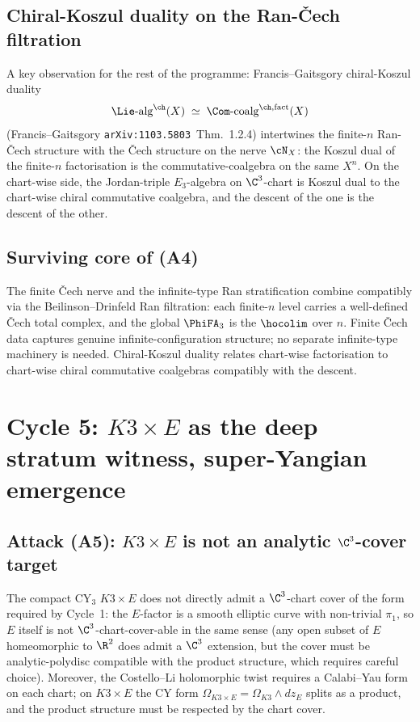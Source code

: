 \subsection*{Chiral-Koszul duality on the Ran-Čech filtration}

A key observation for the rest of the programme: Francis--Gaitsgory
chiral-Koszul duality
\[
  \Lie\text{-alg}^{\ch}(X) \;\simeq\;
  \Com\text{-coalg}^{\ch, \mathrm{fact}}(X)
\]
(Francis--Gaitsgory \texttt{arXiv:1103.5803}~Thm.~1.2.4) intertwines
the finite-$n$ Ran-Čech structure with the Čech structure on the nerve
$\cN_X$: the Koszul dual of the finite-$n$ factorisation is the
commutative-coalgebra on the same $X^n$. On the chart-wise side, the
Jordan-triple $E_3$-algebra on $\C^3$-chart is Koszul dual to the
chart-wise chiral commutative coalgebra, and the descent of the one is
the descent of the other.

\subsection*{Surviving core of (A4)}

The finite Čech nerve and the infinite-type Ran stratification combine
compatibly via the Beilinson--Drinfeld Ran filtration: each finite-$n$
level carries a well-defined Čech total complex, and the global
$\PhiFA_3$ is the $\hocolim$ over $n$. Finite Čech data captures
genuine infinite-configuration structure; no separate infinite-type
machinery is needed. Chiral-Koszul duality relates chart-wise
factorisation to chart-wise chiral commutative coalgebras compatibly
with the descent.

\section{Cycle 5: $K3 \times E$ as the deep stratum witness,
super-Yangian emergence}

\subsection*{Attack (A5): $K3 \times E$ is not an analytic $\C^3$-cover target}

The compact CY$_3$ $K3 \times E$ does not directly admit a $\C^3$-chart
cover of the form required by Cycle~1: the $E$-factor is a smooth
elliptic curve with non-trivial $\pi_1$, so $E$ itself is not
$\C^3$-chart-cover-able in the same sense (any open subset of $E$
homeomorphic to $\R^2$ does admit a $\C^3$ extension, but the cover
must be analytic-polydisc compatible with the product structure, which
requires careful choice). Moreover, the Costello--Li holomorphic twist
requires a Calabi--Yau form on each chart; on $K3 \times E$ the
CY form $\Omega_{K3 \times E} = \Omega_{K3} \wedge dz_E$ splits as a
product, and the product structure must be respected by the chart
cover.

